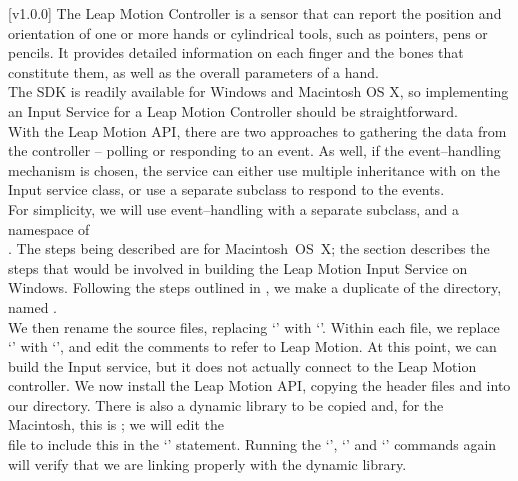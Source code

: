 [v1.0.0]
%
The Leap Motion Controller is a sensor that can report the position and orientation of one
or more hands or cylindrical tools, such as pointers, pens or pencils.
It provides detailed information on each finger and the bones that constitute them, as
well as the overall parameters of a hand.\\

The SDK \textbraceleft{}\textbraceright{} is readily available for Windows and Macintosh
OS X, so implementing an Input Service for a Leap Motion Controller should be
straightforward.\\

With the Leap Motion API, there are two approaches to gathering the data from the
controller -- polling or responding to an event.
As well, if the event--handling mechanism is chosen, the service can either use multiple
inheritance with  on the Input service class, or use a separate
 subclass to respond to the events.\\

For simplicity, we will use event--handling with a separate 
subclass, and a namespace of\\
.
The steps being described are for Macintosh~OS~X; the section
 describes the steps that would be
involved in building the Leap Motion Input Service on Windows.
Following the steps outlined in ,
we make a duplicate of the  directory, named .\\

We then rename the source files, replacing `' with `'. 
\tertiaryEnd{}
Within each file, we replace `' with `', and edit the
comments to refer to Leap Motion.
At this point, we can build the Input service, but it does not actually connect to the
Leap Motion controller.
\tertiaryEnd{}
We now install the Leap Motion API, copying the header files  and
 into our directory.
There is also a dynamic library to be copied and, for the Macintosh, this is
; we will edit the\\
 file to include this in the
`' statement.
Running the `', `' and `' commands again
will verify that we are linking properly with the dynamic library.\\

